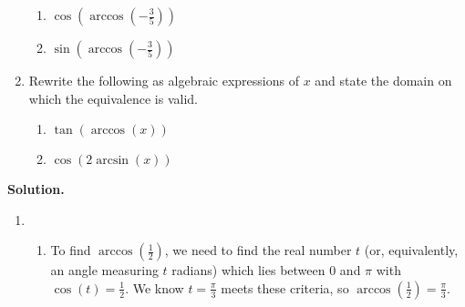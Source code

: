 \begin{ex}
\begin{enumerate}
\begin{multicols}{2}
\begin{enumerate}
\setcounter{HW}{\value{enumii}}

\end{enumerate}

\end{multicols}

\begin{multicols}{2}

\begin{enumerate}

\setcounter{enumii}{\value{HW}}

\item  $\cos\left(\arccos\left(-\frac{3}{5}\right)\right)$
\item  $\sin\left(\arccos\left(-\frac{3}{5}\right)\right)$

\end{enumerate}

\end{multicols}

\item  \label{algarcsincos} Rewrite the following as algebraic expressions of $x$ and state the domain on which the equivalence is valid.

\begin{multicols}{2}

\begin{enumerate}

\item \label{tanarccos} $\tan\left(\arccos\left(x \right)\right)$

\item  \label{cosarcsin} $\cos\left(2 \arcsin(x)\right)$

\end{enumerate}

\end{multicols}

\end{enumerate}

{\bf Solution.}

\begin{enumerate}

\item 

\begin{enumerate}

\item  To find $\arccos\left(\frac{1}{2}\right)$, we need to find the real number $t$ (or, equivalently, an angle measuring $t$ radians) which lies between $0$ and $\pi$ with $\cos(t) = \frac{1}{2}$. We know $t = \frac{\pi}{3}$ meets these criteria, so $\arccos\left(\frac{1}{2}\right)= \frac{\pi}{3}$.


\end{enumerate}
\end{enumerate}
\end{ex}
